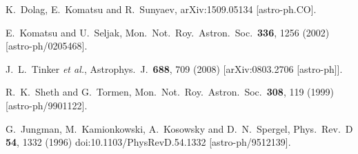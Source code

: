 \documentclass[aps,twocolumn,floats,prd,nofootinbib,10pt,floatfix]{revtex4-1}
\begin{document}
\begin{thebibliography}{99}
  K.~Dolag, E.~Komatsu and R.~Sunyaev,
  arXiv:1509.05134 [astro-ph.CO].

  E.~Komatsu and U.~Seljak,
  Mon.\ Not.\ Roy.\ Astron.\ Soc.\  {\bf 336}, 1256 (2002)
  [astro-ph/0205468].


  J.~L.~Tinker {\it et al.},
  Astrophys.\ J.\  {\bf 688}, 709 (2008)
  [arXiv:0803.2706 [astro-ph]].

  R.~K.~Sheth and G.~Tormen,
  Mon.\ Not.\ Roy.\ Astron.\ Soc.\  {\bf 308}, 119 (1999)
  [astro-ph/9901122].

  G.~Jungman, M.~Kamionkowski, A.~Kosowsky and D.~N.~Spergel,
  Phys.\ Rev.\ D {\bf 54}, 1332 (1996)
  doi:10.1103/PhysRevD.54.1332
  [astro-ph/9512139].

\end{thebibliography}
\end{document}
